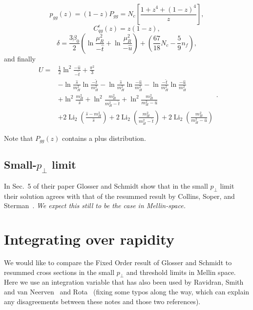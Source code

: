 \documentclass[10pt]{report}
\begin{document}
\begin{equation}
p_{g g}(z)=(1-z) P_{g g}=N_{c}\left[\frac{1+z^{4}+(1-z)^{4}}{z}\right],
\end{equation}
\begin{equation}
C_{q g}^{\epsilon}(z)=z(1-z),
\end{equation}
\begin{equation}
\delta=\frac{3 \beta_{0}}{2}\left(\ln \frac{\mu_{R}^{2}}{-\hat{t}}+\ln \frac{\mu_{R}^{2}}{-\hat{u}}\right)+\left(\frac{67}{18} N_{c}-\frac{5}{9} n_{f}\right),
\end{equation}
and finally
\begin{equation}
\begin{aligned}
U=& \frac{1}{2} \ln ^{2} \frac{-\hat{u}}{-\hat{t}}+\frac{\pi^{2}}{3} \\
&-\ln \frac{\hat{s}}{m_{H}^{2}} \ln \frac{-\hat{t}}{m_{H}^{2}}-\ln \frac{\hat{s}}{m_{H}^{2}} \ln \frac{-\hat{u}}{m_{H}^{2}}-\ln \frac{-\hat{t}}{m_{H}^{2}} \ln \frac{-\hat{u}}{m_{H}^{2}} \\
&+\ln ^{2} \frac{m_{H}^{2}}{\hat{s}}+\ln ^{2} \frac{m_{H}^{2}}{m_{H}^{2}-\hat{t}}+\ln ^{2} \frac{m_{H}^{2}}{m_{H}^{2}-\hat{u}} \\
&+2 \operatorname{Li}_{2}\left(\frac{\hat{s}-m_{H}^{2}}{\hat{s}}\right)+2 \operatorname{Li}_{2}\left(\frac{m_{H}^{2}}{m_{H}^{2}-\hat{t}}\right)+2 \operatorname{Li}_{2}\left(\frac{m_{H}^{2}}{m_{H}^{2}-\hat{u}}\right)
\end{aligned}.
\end{equation}

Note that $P_{g g}(z)$ contains a plus distribution. 

\subsection{Small-$p_\perp$ limit}
In Sec.~5 of their paper Glosser and Schmidt show that in the small $p_\perp$ limit their solution agrees with that of the resummed result by Collins, Soper, and Sterman~\citep{Collins1985}. \textit{We expect this still to be the case in Mellin-space. }



\section{Integrating over rapidity}

We would like to compare the Fixed Order result of Glosser and Schmidt to resummed cross sections in the small $p_\perp$ and threshold limits in Mellin space. Here we use an integration variable that has also been used by Ravidran, Smith and van Neerven~\citep{Ravindran2002} and Rota~\citep{Rota2020} (fixing some typos along the way, which can explain any disagreements between these notes and those two references).
\end{document}
